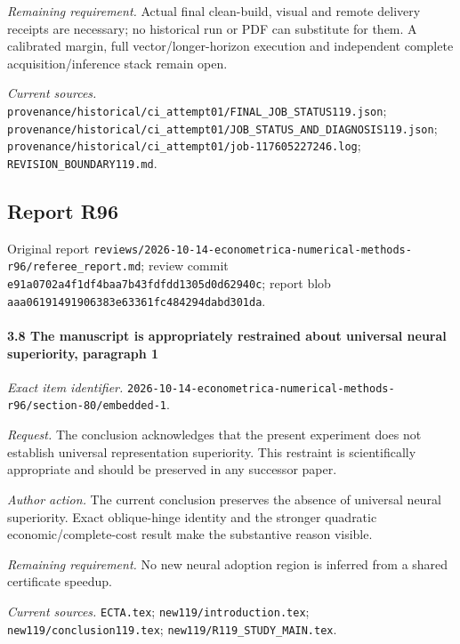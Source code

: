 \par\emph{Remaining requirement.} Actual final clean-build, visual and remote delivery receipts are necessary; no historical run or PDF can substitute for them. A calibrated margin, full vector/\allowbreak{}longer-horizon execution and independent complete acquisition/\allowbreak{}inference stack remain open.

\par\emph{Current sources.} \nolinkurl{provenance/historical/ci_attempt01/FINAL_JOB_STATUS119.json}; \nolinkurl{provenance/historical/ci_attempt01/JOB_STATUS_AND_DIAGNOSIS119.json}; \nolinkurl{provenance/historical/ci_attempt01/job-117605227246.log}; \nolinkurl{REVISION_BOUNDARY119.md}.

\subsection{Report R96}

Original report \nolinkurl{reviews/2026-10-14-econometrica-numerical-methods-r96/referee_report.md}; review commit \nolinkurl{e91a0702a4f1df4baa7b43fdfdd1305d0d62940c}; report blob \nolinkurl{aaa06191491906383e63361fc484294dabd301da}.

\paragraph{3.8 The manuscript is appropriately restrained about universal neural superiority, paragraph 1}

\emph{Exact item identifier.} \nolinkurl{2026-10-14-econometrica-numerical-methods-r96/section-80/embedded-1}.

\par\emph{Request.} The conclusion acknowledges that the present experiment does not establish universal representation superiority. This restraint is scientifically appropriate and should be preserved in any successor paper.

\par\emph{Author action.} The current conclusion preserves the absence of universal neural superiority. Exact oblique-hinge identity and the stronger quadratic economic/\allowbreak{}complete-cost result make the substantive reason visible.

\par\emph{Remaining requirement.} No new neural adoption region is inferred from a shared certificate speedup.

\par\emph{Current sources.} \nolinkurl{ECTA.tex}; \nolinkurl{new119/introduction.tex}; \nolinkurl{new119/conclusion119.tex}; \nolinkurl{new119/R119_STUDY_MAIN.tex}.

